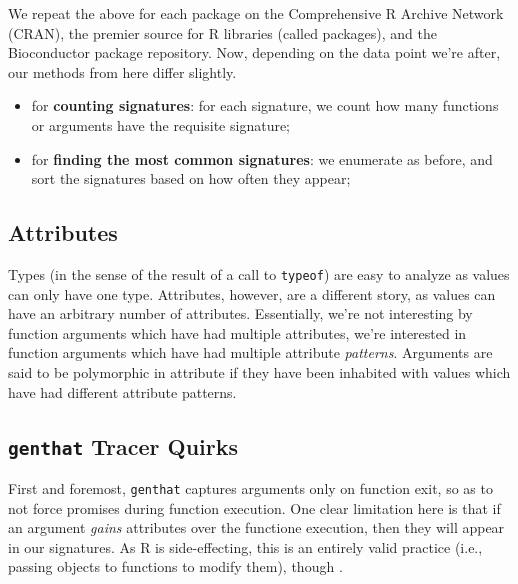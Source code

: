\documentclass[acmsmall,10pt,review,anonymous]{acmart}\settopmatter{printfolios=true,printccs=false,printacmref=false}
\begin{document}
We repeat the above for each package on the Comprehensive R Archive Network (CRAN), the premier source for R libraries (called packages), and the Bioconductor package repository.
Now, depending on the data point we're after, our methods from here differ slightly.

\begin{itemize}
    \item for \textbf{counting signatures}: for each signature, we count how many functions or arguments have the requisite signature;
    \item for \textbf{finding the most common signatures}: we enumerate as before, and sort the signatures based on how often they appear;
\end{itemize}

%
%
%
%
\subsection{Attributes}
\label{sec:method:attributes}

Types (in the sense of the result of a call to {\tt typeof}) are easy to analyze as values can only have one type.
Attributes, however, are a different story, as values can have an arbitrary number of attributes.
Essentially, we're not interesting by function arguments which have had multiple attributes, we're interested in function arguments which have had multiple attribute \textit{patterns}. 
Arguments are said to be polymorphic in attribute if they have been inhabited with values which have had different attribute patterns.




%
%
%
%
\subsection{{\tt genthat} Tracer Quirks}

First and foremost, {\tt genthat} captures arguments only on function exit, so as to not force promises during function execution.
 One clear limitation here is that if an argument \textit{gains} attributes over the functione execution, then they will appear in our signatures.
As R is side-effecting, this is an entirely valid practice (i.e., passing objects to functions to modify them), though .
\end{document}
